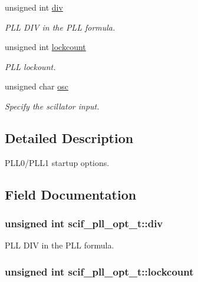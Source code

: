 \begin{DoxyCompactItemize}
unsigned int \hyperlink{structscif__pll__opt__t_ac5f2397759d35572bfeeab93dda0c776}{div}
\begin{DoxyCompactList}\small\item\em \-P\-L\-L \-D\-I\-V in the \-P\-L\-L formula. \end{DoxyCompactList}\item 
unsigned int \hyperlink{structscif__pll__opt__t_a34359a906929e13a238b290925d1dff8}{lockcount}
\begin{DoxyCompactList}\small\item\em \-P\-L\-L lockount. \end{DoxyCompactList}\item 
unsigned char \hyperlink{structscif__pll__opt__t_aee09a41840d5059cbb116689ea851d0f}{osc}
\begin{DoxyCompactList}\small\item\em \-Specify the scillator input. \end{DoxyCompactList}\end{DoxyCompactItemize}


\subsection{\-Detailed \-Description}
\-P\-L\-L0/\-P\-L\-L1 startup options. 

\subsection{\-Field \-Documentation}
\hypertarget{structscif__pll__opt__t_ac5f2397759d35572bfeeab93dda0c776}{
\subsubsection[{div}]{\setlength{\rightskip}{0pt plus 5cm}unsigned int {\bf scif\-\_\-pll\-\_\-opt\-\_\-t\-::div}}}
\label{structscif__pll__opt__t_ac5f2397759d35572bfeeab93dda0c776}


\-P\-L\-L \-D\-I\-V in the \-P\-L\-L formula. 

\hypertarget{structscif__pll__opt__t_a34359a906929e13a238b290925d1dff8}{
\subsubsection[{lockcount}]{\setlength{\rightskip}{0pt plus 5cm}unsigned int {\bf scif\-\_\-pll\-\_\-opt\-\_\-t\-::lockcount}}}
\label{structscif__pll__opt__t_a34359a906929e13a238b290925d1dff8}


